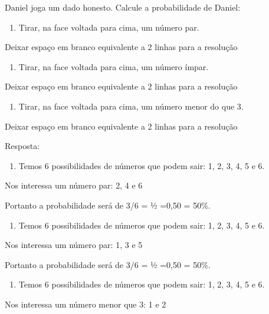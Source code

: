 Daniel joga um dado honesto. Calcule a probabilidade de Daniel:

\begin{enumerate}
\def\labelenumi{\alph{enumi})}
\item
  Tirar, na face voltada para cima, um número par.
\end{enumerate}

Deixar espaço em branco equivalente a 2 linhas para a resolução

\begin{enumerate}
\def\labelenumi{\alph{enumi})}
\item
  Tirar, na face voltada para cima, um número ímpar.
\end{enumerate}

Deixar espaço em branco equivalente a 2 linhas para a resolução

\begin{enumerate}
\def\labelenumi{\alph{enumi})}
\item
  Tirar, na face voltada para cima, um número menor do que 3.
\end{enumerate}

Deixar espaço em branco equivalente a 2 linhas para a resolução

Resposta:

\begin{enumerate}
\def\labelenumi{\alph{enumi})}
\item
  Temos 6 possibilidades de números que podem sair: 1, 2, 3, 4, 5 e 6.
\end{enumerate}

Nos interessa um número par: 2, 4 e 6

Portanto a probabilidade será de 3/6 = ½ =0,50 = 50\%.

\begin{enumerate}
\def\labelenumi{\alph{enumi})}
\item
  Temos 6 possibilidades de números que podem sair: 1, 2, 3, 4, 5 e 6.
\end{enumerate}

Nos interessa um número par: 1, 3 e 5

Portanto a probabilidade será de 3/6 = ½ =0,50 = 50\%.

\begin{enumerate}
\def\labelenumi{\alph{enumi})}
\item
  Temos 6 possibilidades de números que podem sair: 1, 2, 3, 4, 5 e 6.
\end{enumerate}

Nos interessa um número menor que 3: 1 e 2

